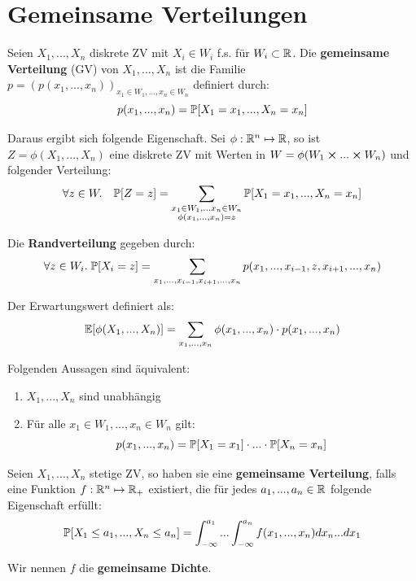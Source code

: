 \section{Gemeinsame Verteilungen}



\begin{tcolorbox}
    Seien $X_1,...,X_n$ diskrete ZV mit $X_i \in W_i$ f.s. für $W_i \subset \mathbb{R}$. Die \textbf{gemeinsame Verteilung} (GV) von $X_1,...,X_n$ ist die Familie $p = (p(x_1, ..., x_n))_{x_1 \in W_1, ..., x_n \in W_n}$ definiert durch:
    $$p(x_1, ..., x_n) = \mathbb{P}[X_1 = x_1, ..., X_n = x_n]$$
\end{tcolorbox}

Daraus ergibt sich folgende Eigenschaft. Sei $\phi: \mathbb{R}^n \mapsto \mathbb{R}$, so ist $Z = \phi(X_1,...,X_n)$ eine diskrete ZV mit Werten in $W = \phi(W_1 \cross ... \cross W_n)$ und folgender Verteilung:
$$\forall z \in W. \quad \mathbb{P}[Z = z] = \sum\limits_{ \substack{x_1 \in W_1, ... x_n \in W_n \\ \phi(x_1, ..., x_n) = z}} \mathbb{P}[X_1 = x_1, ..., X_n = x_n]$$

\Satz Die \textbf{Randverteilung} gegeben durch:
$$\forall z \in W_i. \; \mathbb{P}[X_i = z] = \sum_{x_1, ..., x_{i-1}, x_{i+1},...,x_n} p(x_1, ..., x_{i-1}, z, x_{i+1},...,x_n)$$

\Satz Der Erwartungswert definiert als:
$$\mathbb{E}[\phi(X_1, ..., X_n)] = \sum\limits_{x_1,...,x_n} \phi(x_1,...,x_n) \cdot p(x_1,...,x_n)$$

\Satz Folgenden Aussagen sind äquivalent:
\begin{enumerate}
    \item $X_1,...,X_n$ sind unabhängig
    \item Für alle $x_1 \in W_1, ..., x_n \in W_n$ gilt: 
    $$p(x_1,...,x_n) = \mathbb{P}[X_1 = x_1] \cdot ... \cdot \mathbb{P}[X_n = x_n]$$
\end{enumerate}



\begin{tcolorbox}
    Seien $X_1,...,X_n$ stetige ZV, so haben sie eine \textbf{gemeinsame Verteilung}, falls eine Funktion $f: \mathbb{R}^n \mapsto \mathbb{R}_+$ existiert, die für jedes $a_1,...,a_n \in \mathbb{R}$ folgende Eigenschaft erfüllt:
    $$\mathbb{P}[X_1 \leq a_1,..., X_n \leq a_n] = \int_{-\infty}^{a_1} ... \int_{-\infty}^{a_n} f(x_1,..., x_n) dx_n ... dx_1$$
    
    Wir nennen $f$ die \textbf{gemeinsame Dichte}.
\end{tcolorbox}

